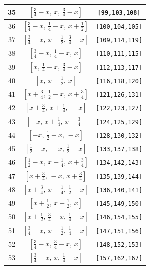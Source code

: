 \documentclass[fleqn,8pt]{jsarticle}
\begin{document}
\begin{longtable}{ccc}
35 & $\left[ \frac{3}{4} - x,\, x,\, \frac{3}{4} - x \right]$ & {\tt [99,103,108]} \\ \hline
36 & $\left[ \frac{3}{4} - x,\, \frac{1}{4} - x,\, x + \frac{1}{2} \right]$ & {\tt [100,104,105]} \\ \hline
37 & $\left[ \frac{3}{4} - x,\, x + \frac{1}{2},\, \frac{3}{4} - x \right]$ & {\tt [109,114,119]} \\ \hline
38 & $\left[ \frac{3}{4} - x,\, \frac{1}{4} - x,\, x \right]$ & {\tt [110,111,115]} \\ \hline
39 & $\left[ x,\, \frac{1}{4} - x,\, \frac{3}{4} - x \right]$ & {\tt [112,113,117]} \\ \hline
40 & $\left[ x,\, x + \frac{1}{2},\, x \right]$ & {\tt [116,118,120]} \\ \hline
41 & $\left[ x + \frac{3}{4},\, \frac{1}{2} - x,\, x + \frac{3}{4} \right]$ & {\tt [121,126,131]} \\ \hline
42 & $\left[ x + \frac{3}{4},\, x + \frac{1}{4},\, - x \right]$ & {\tt [122,123,127]} \\ \hline
43 & $\left[ - x,\, x + \frac{1}{4},\, x + \frac{3}{4} \right]$ & {\tt [124,125,129]} \\ \hline
44 & $\left[ - x,\, \frac{1}{2} - x,\, - x \right]$ & {\tt [128,130,132]} \\ \hline
45 & $\left[ \frac{1}{2} - x,\, - x,\, \frac{1}{2} - x \right]$ & {\tt [133,137,138]} \\ \hline
46 & $\left[ \frac{1}{2} - x,\, x + \frac{1}{4},\, x + \frac{3}{4} \right]$ & {\tt [134,142,143]} \\ \hline
47 & $\left[ x + \frac{3}{4},\, - x,\, x + \frac{3}{4} \right]$ & {\tt [135,139,144]} \\ \hline
48 & $\left[ x + \frac{3}{4},\, x + \frac{1}{4},\, \frac{1}{2} - x \right]$ & {\tt [136,140,141]} \\ \hline
49 & $\left[ x + \frac{1}{2},\, x + \frac{1}{2},\, x \right]$ & {\tt [145,149,150]} \\ \hline
50 & $\left[ x + \frac{1}{2},\, \frac{3}{4} - x,\, \frac{1}{4} - x \right]$ & {\tt [146,154,155]} \\ \hline
51 & $\left[ \frac{3}{4} - x,\, x + \frac{1}{2},\, \frac{1}{4} - x \right]$ & {\tt [147,151,156]} \\ \hline
52 & $\left[ \frac{3}{4} - x,\, \frac{3}{4} - x,\, x \right]$ & {\tt [148,152,153]} \\ \hline
53 & $\left[ \frac{3}{4} - x,\, x,\, \frac{1}{4} - x \right]$ & {\tt [157,162,167]} \\ \hline

\end{longtable}
\end{document}
